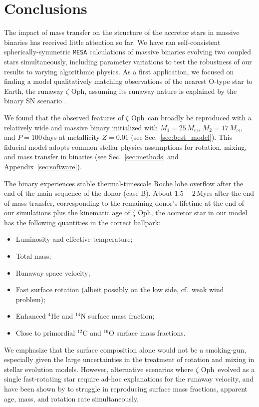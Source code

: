 \documentclass[twocolumn,twocolappendix,trackchanges]{aastex63}
\DeclareRobustCommand{\Secref}[1]{Sec.~\ref{#1}}
\newcommand{\zoph}{$\zeta$ Oph}
\begin{document}
\section{Conclusions}
\label{sec:conclusions}

The impact of mass transfer on the structure of the accretor stars in
massive binaries has received little attention so far. We have ran
self-consistent spherically-symmetric \texttt{MESA} calculations of
massive binaries evolving two coupled stars simultaneously,
including parameter variations to test the robustness of our results
to varying algorithmic physics.  As a first application, we focused on
finding a model qualitatively matching observations of the nearest
O-type star to Earth, the runaway \zoph, assuming its runaway nature
is explained by the binary SN scenario \citep{blaauw:61}.

We found that the observed features of
\zoph\ can broadly be reproduced with a relatively wide and massive
binary initialized with
$M_1=25\,M_\odot$, $M_2=17\,M_\odot$, and $P=100$\,days at metallicity
$Z=0.01$ (see \Secref{sec:best_model}). This fiducial
model adopts common stellar physics
assumptions for rotation, mixing, and mass transfer in
binaries (see \Secref{sec:methods} and Appendix~\ref{sec:software}).

The binary experiences stable thermal-timescale Roche lobe
overflow after the end of the main sequence of the donor (case B). About $1.5-2$\,Myrs after the end of mass
transfer, corresponding to the remaining donor's lifetime at the end
of our simulations plus the kinematic age of \zoph, the accretor star
in our model has the following quantities in the correct ballpark:
\begin{itemize}
\item Luminosity and effective temperature;
\item Total mass;
\item Runaway space velocity;
\item Fast surface rotation (albeit possibly on the low side, cf.~weak wind problem);
\item Enhanced $^4\mathrm{He}$ and $^{14}\mathrm{N}$ surface mass fraction;
\item Close to primordial $^{12}\mathrm{C}$ and $^{16}\mathrm{O}$ surface mass fractions.
\end{itemize}

We emphasize that the surface composition alone would not be a smoking-gun,
especially given the large uncertainties in the treatment of rotation
and mixing in stellar evolution models. However, alternative scenarios where \zoph\
evolved as a single fast-rotating star require ad-hoc explanations for the runaway velocity,
and have been shown by \citetalias{villamariz:05} to struggle in reproducing
surface mass fractions, apparent age, mass, and rotation rate simultaneously.
\end{document}

